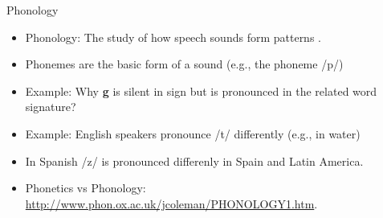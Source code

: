 \documentclass[handout]{beamer}
\begin{document}
\begin{frame}{Phonology}
\scriptsize{
\begin{itemize}
\item Phonology: The study of how speech sounds form patterns \cite{fromkin2018introduction}.
\item Phonemes are  the basic form of a sound (e.g., the phoneme /p/)
\item Example: Why \textbf{g} is silent in sign but is pronounced in the related word signature?
\item Example: English speakers pronounce /t/ differently (e.g., in water)
\item In Spanish /z/ is pronounced differenly in Spain and Latin America.
\item Phonetics vs Phonology: \url{http://www.phon.ox.ac.uk/jcoleman/PHONOLOGY1.htm}.
\end{itemize}
}
\end{frame}
\end{document}
